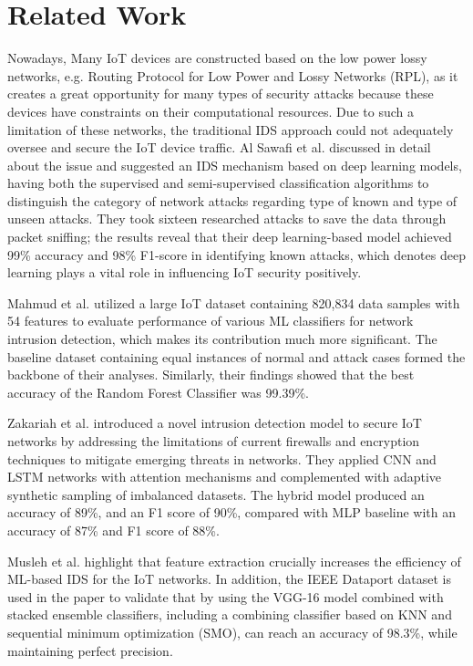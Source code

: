 \section{Related Work}
Nowadays, Many IoT devices are constructed based on the low power lossy networks, e.g. Routing Protocol for Low Power and Lossy Networks (RPL), as it creates a great opportunity for many types of security attacks because these devices have constraints on their computational resources. Due to such a limitation of these networks, the traditional IDS approach could not adequately oversee and secure the IoT device traffic. Al Sawafi et al. \cite{al_sawafi2023hybrid} discussed in detail about the issue and suggested an IDS mechanism based on deep learning models, having both the supervised and semi-supervised classification algorithms to distinguish the category of network attacks regarding type of known and type of unseen attacks. They took sixteen researched attacks to save the data through packet sniffing; the results reveal that their deep learning-based model achieved 99\% accuracy and 98\% F1-score in identifying known attacks, which denotes deep learning plays a vital role in influencing IoT security positively.

Mahmud et al. \cite{mahmud2024optimized} utilized a large IoT dataset containing 820,834 data samples with 54 features to evaluate performance of various ML classifiers for network intrusion detection, which makes its contribution much more significant. The baseline dataset containing equal instances of normal and attack cases formed the backbone of their analyses. Similarly, their findings showed that the best accuracy of the Random Forest Classifier was 99.39\%. 

Zakariah et al. \cite{zakariah2023machine} introduced a novel intrusion detection model to secure IoT networks by addressing the limitations of current firewalls and encryption techniques to mitigate emerging threats in networks. They applied CNN and LSTM networks with attention mechanisms and complemented with adaptive synthetic sampling of imbalanced datasets. The hybrid model produced an accuracy of 89\%, and an F1 score of 90\%, compared with MLP baseline with an accuracy of 87\% and F1 score of 88\%.

Musleh et al. \cite{musleh2023intrusion} highlight that feature extraction crucially increases the efficiency of ML-based IDS for the IoT networks. In addition, the IEEE Dataport dataset is used in the paper to validate that by using the VGG-16 model combined with stacked ensemble classifiers, including a combining classifier based on KNN and sequential minimum optimization (SMO), can reach an accuracy of 98.3\%, while maintaining perfect precision.

